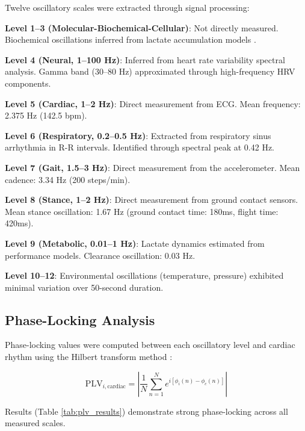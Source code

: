 \documentclass[12pt]{article}
\theoremstyle{remark}
\begin{document}
Twelve oscillatory scales were extracted through signal processing:

\textbf{Level 1--3 (Molecular-Biochemical-Cellular)}: Not directly measured. Biochemical oscillations inferred from lactate accumulation models \citep{cairns2005lactic}.

\textbf{Level 4 (Neural, 1--100 Hz)}: Inferred from heart rate variability spectral analysis. Gamma band (30--80 Hz) approximated through high-frequency HRV components.

\textbf{Level 5 (Cardiac, 1--2 Hz)}: Direct measurement from ECG. Mean frequency: 2.375 Hz (142.5 bpm).

\textbf{Level 6 (Respiratory, 0.2--0.5 Hz)}: Extracted from respiratory sinus arrhythmia in R-R intervals. Identified through spectral peak at 0.42 Hz.

\textbf{Level 7 (Gait, 1.5--3 Hz)}: Direct measurement from the accelerometer. Mean cadence: 3.34 Hz (200 steps/min).

\textbf{Level 8 (Stance, 1--2 Hz)}: Direct measurement from ground contact sensors. Mean stance oscillation: 1.67 Hz (ground contact time: 180ms, flight time: 420ms).

\textbf{Level 9 (Metabolic, 0.01--1 Hz)}: Lactate dynamics estimated from performance models. Clearance oscillation: 0.03 Hz.

\textbf{Level 10--12}: Environmental oscillations (temperature, pressure) exhibited minimal variation over 50-second duration.

\subsection{Phase-Locking Analysis}

Phase-locking values were computed between each oscillatory level and cardiac rhythm using the Hilbert transform method \citep{lachaux1999measuring}:

\begin{equation}
\text{PLV}_{i,\text{cardiac}} = \left|\frac{1}{N}\sum_{n=1}^N e^{i[\phi_i(n) - \phi_c(n)]}\right|
\end{equation}

Results (Table \ref{tab:plv_results}) demonstrate strong phase-locking across all measured scales.
\end{document}
